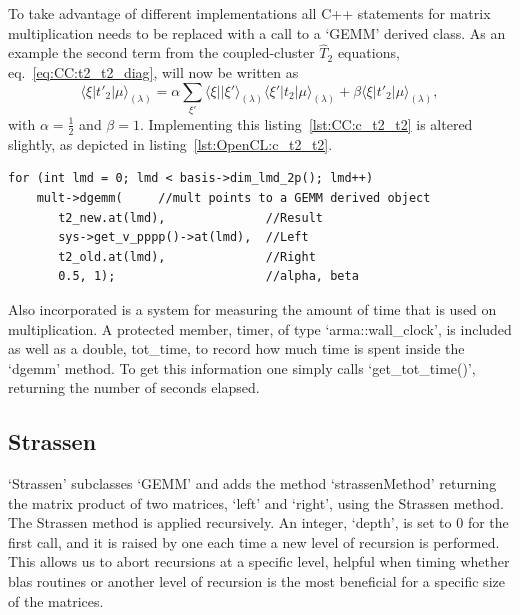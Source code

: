 To take advantage of different implementations all C++ statements for matrix multiplication needs to be replaced with a call to a `GEMM' derived class.
As an example the second term from the coupled-cluster $\hat{T}_2$ equations, eq.~\eqref{eq:CC:t2_t2_diag}, will now be written as 
\begin{equation}
\langle \xi | t'_2 | \mu \rangle_{(\lambda)} = \alpha \sum_{\xi'} \langle \xi || \xi' \rangle_{(\lambda)} \langle \xi' |t_2| \mu \rangle_{(\lambda)} + \beta \langle \xi | t'_2 | \mu \rangle_{(\lambda)},
\end{equation}
with $\alpha = \frac{1}{2}$ and $\beta = 1$.
Implementing this listing~\ref{lst:CC:c_t2_t2} is altered slightly, as depicted in listing~\ref{lst:OpenCL:c_t2_t2}.
\begin{lstlisting}[float,label={lst:OpenCL:c_t2_t2},caption={Second term of the coupled-cluster $\hat{T}_2$ equations, now using the matrix-multiplication framework in `GEMM'.}]
for (int lmd = 0; lmd < basis->dim_lmd_2p(); lmd++)
    mult->dgemm(     //mult points to a GEMM derived object
       t2_new.at(lmd),              //Result
       sys->get_v_pppp()->at(lmd),  //Left
       t2_old.at(lmd),              //Right
       0.5, 1);                     //alpha, beta
\end{lstlisting}

Also incorporated is a system for measuring the amount of time that is used on multiplication.
A protected member, timer, of type `arma::wall\_clock', is included as well as a double, tot\_time, to record how much time is spent inside the `dgemm' method.
To get this information one simply calls `get\_tot\_time()', returning the number of seconds elapsed.


\subsection{Strassen}
`Strassen' subclasses `GEMM' and adds the method `strassenMethod' returning the matrix product of two matrices, `left' and `right', using the Strassen method.
The Strassen method is applied recursively.
An integer, `depth', is set to $0$ for the first call, and it is raised by one each time a new level of recursion is performed.
This allows us to abort recursions at a specific level, helpful when timing whether blas routines or another level of recursion is the most beneficial for a specific size of the matrices.

